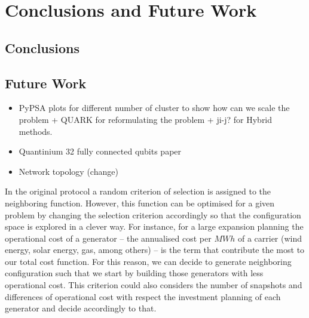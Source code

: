 
\chapter{Conclusions and Future Work} %

\label{Chapter6} %




\section{Conclusions}

\section{Future Work}
\begin{itemize}
    \item PyPSA plots for different number of cluster to show how can we scale the problem + QUARK for reformulating the problem + ji-j? for Hybrid methods.
    \item Quantinium 32 fully connected qubits paper
    \item Network topology (change)
\end{itemize}

In the original protocol a random criterion of selection is assigned to the neighboring function. However, this function can be optimised for a given problem by changing the selection criterion accordingly so that the configuration space is explored in a clever way. For instance, for a large expansion planning the operational cost of a generator -- the annualised cost per $MWh$ of a carrier (wind energy, solar energy, gas, among others) --  is the term that contribute the most to our total cost function. For this reason, we can decide to generate neighboring configuration such that we start by building those generators with less operational cost. This criterion could also considers the number of snapshots and differences of operational cost with respect the investment planning of each generator and decide accordingly to that.


